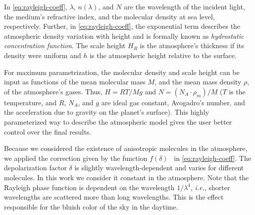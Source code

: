 \documentclass[journal]{vgtc}                %
\newcommand{\review}[1]{{\color{blue}#1}}
\begin{document}
\review{

In \autoref{eq:rayleigh-coeff}, $\lambda$, $n(\lambda)$, and $N$ are the wavelength of the incident light, the medium's refractive index, and the molecular density at sea level, respectively. Further, in \autoref{eq:rayleigh-coeff}, the exponential term describes the atmospheric density variation with height and is formally known as \emph{hydrostatic concentration function}. The scale height $H_R$ is the atmosphere's thickness if its density were uniform and $h$ is 
the atmospheric height relative to the surface.
}

\review{
For maximum parametrization, the molecular density and scale height can be input as functions of the mean molecular mass $M$, and the mean mass density $\rho$, of the atmosphere's gases. Thus, $H = RT/Mg$ and $N = (N_A\cdot \rho_{m})/M$ ($T$ is the temperature, and $R$, $N_A$, and $g$ are ideal gas constant, Avogadro's number, and the acceleration due to gravity on the planet's surface).} This highly parameterized way to describe the atmospheric model gives \review{the user} better control over the final results.


\review{Because we considered the existence of anisotropic molecules in the atmosphere, we applied the correction given by the function $f(\delta)$~\cite{Liou:2002} in \autoref{eq:rayleigh-coeff}}. The depolarization factor $\delta$ is slightly wavelength-dependent and varies for different molecules. In this work we consider it constant in the atmosphere.
Note that the Rayleigh phase function is dependent on the wavelength $1/\lambda^4$, \textit{i.e.}, shorter wavelengths are scattered more than long wavelengths. This is the effect responsible for the bluish color of the sky in the daytime.
\end{document}
